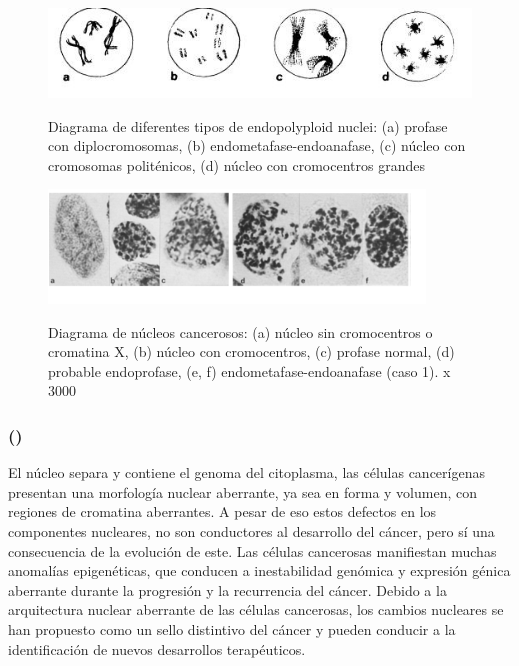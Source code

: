 \documentclass[12pt, letterpaper]{article}
\begin{document}
\begin{figure}[h]
\centering
	\includegraphics[width=12cm]{endopolyploid-nuclei-thermanStructureOriginGiant1983.jpg}
	\label{fig: endopolyploid-nuclei}
	\caption{Diagrama de diferentes tipos de endopolyploid nuclei: (a) profase con diplocromosomas, (b) endometafase-endoanafase, (c) núcleo con cromosomas politénicos, (d) núcleo con cromocentros grandes}
	\autocite{thermanStructureOriginGiant1983}
\end{figure}

\pagebreak

\begin{figure}[h]
\centering
	\includegraphics[width=10cm]{cancerous-nuclei-thermanStructureOriginGiant1983.png}
	\label{fig: cancerous-nuclei}
	\caption{Diagrama de núcleos cancerosos: (a) núcleo sin cromocentros o cromatina X, (b) núcleo con cromocentros, (c) profase normal, (d) probable endoprofase, (e, f) endometafase-endoanafase (caso 1). x 3000}
	\autocite{thermanStructureOriginGiant1983}
\end{figure}

\pagebreak

\subsubsection{\texorpdfstring{ (\citeauthor{madrazoCellIntegrinsNew2017})}{}}

El núcleo separa y contiene el genoma del citoplasma, las células cancerígenas presentan una morfología nuclear aberrante, ya sea en forma y volumen, con regiones de cromatina aberrantes. A pesar de eso estos defectos en los componentes nucleares, no son conductores al desarrollo del cáncer, pero sí una consecuencia de la evolución de este. Las células cancerosas manifiestan muchas anomalías epigenéticas, que conducen a inestabilidad genómica y expresión génica aberrante durante la progresión y la recurrencia del cáncer. Debido a la arquitectura nuclear aberrante de las células cancerosas, los cambios nucleares se han propuesto como un sello distintivo del cáncer y pueden conducir a la identificación de nuevos desarrollos terapéuticos.
\end{document}
